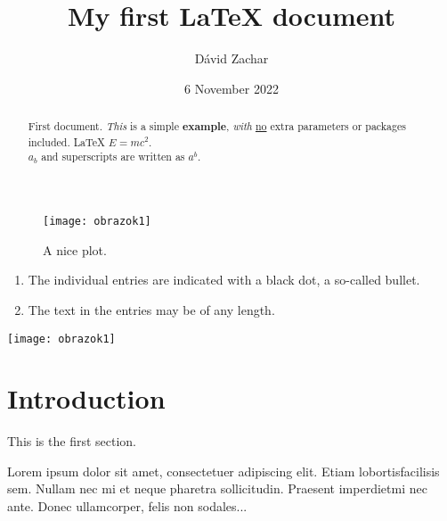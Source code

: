 \documentclass{article}
\title{My first LaTeX document}
\author{Dávid Zachar}
\date{6 November 2022}
\begin{document}
\maketitle
\tableofcontents
\begin{abstract}
First document. \emph{This} is a simple \textbf{example}, \textit{with} \underline{no} 
extra parameters or packages included. \LaTeX{} $E=mc^2$.\\
$a_b$ and superscripts are written as $a^b$.
\end{abstract}

\begin{figure}[h]
    \centering
    \texttt{[image: obrazok1]}
    \caption{A nice plot.}
    \label{fig:mesh1}
\end{figure}

\begin{enumerate}
  \item The individual entries are indicated with a black dot, a so-called bullet.
  \item The text in the entries may be of any length.
\end{enumerate}

\texttt{[image: obrazok1]} 

\section{Introduction}
   
This is the first section.
      
Lorem  ipsum  dolor  sit  amet,  consectetuer  adipiscing  
elit.   Etiam  lobortisfacilisis sem.  Nullam nec mi et 
neque pharetra sollicitudin.  Praesent imperdietmi nec ante. 
Donec ullamcorper, felis non sodales...
\end{document}
